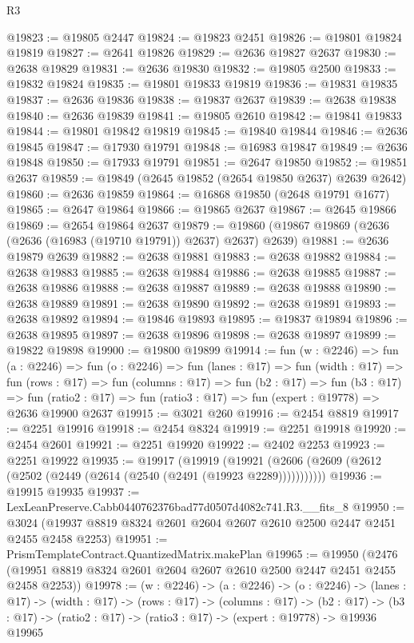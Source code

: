 \begin{lexlean}{R3}
\begin{coremodule}
@19823 := @19805 @2447
@19824 := @19823 @2451
@19826 := @19801 @19824 @19819
@19827 := @2641 @19826
@19829 := @2636 @19827 @2637
@19830 := @2638 @19829
@19831 := @2636 @19830
@19832 := @19805 @2500
@19833 := @19832 @19824
@19835 := @19801 @19833 @19819
@19836 := @19831 @19835
@19837 := @2636 @19836
@19838 := @19837 @2637
@19839 := @2638 @19838
@19840 := @2636 @19839
@19841 := @19805 @2610
@19842 := @19841 @19833
@19844 := @19801 @19842 @19819
@19845 := @19840 @19844
@19846 := @2636 @19845
@19847 := @17930 @19791
@19848 := @16983 @19847
@19849 := @2636 @19848
@19850 := @17933 @19791
@19851 := @2647 @19850
@19852 := @19851 @2637
@19859 := @19849 (@2645 @19852 (@2654 @19850 @2637) @2639 @2642)
@19860 := @2636 @19859
@19864 := @16868 @19850 (@2648 @19791 @1677)
@19865 := @2647 @19864
@19866 := @19865 @2637
@19867 := @2645 @19866
@19869 := @2654 @19864 @2637
@19879 := @19860 (@19867 @19869 (@2636 (@2636 (@16983 (@19710 @19791)) @2637) @2637) @2639)
@19881 := @2636 @19879 @2639
@19882 := @2638 @19881
@19883 := @2638 @19882
@19884 := @2638 @19883
@19885 := @2638 @19884
@19886 := @2638 @19885
@19887 := @2638 @19886
@19888 := @2638 @19887
@19889 := @2638 @19888
@19890 := @2638 @19889
@19891 := @2638 @19890
@19892 := @2638 @19891
@19893 := @2638 @19892
@19894 := @19846 @19893
@19895 := @19837 @19894
@19896 := @2638 @19895
@19897 := @2638 @19896
@19898 := @2638 @19897
@19899 := @19822 @19898
@19900 := @19800 @19899
@19914 := fun (w : @2246) =>
  fun (a : @2246) =>
  fun (o : @2246) =>
  fun (lanes : @17) =>
  fun (width : @17) =>
  fun (rows : @17) =>
  fun (columns : @17) =>
  fun (b2 : @17) =>
  fun (b3 : @17) =>
  fun (ratio2 : @17) => fun (ratio3 : @17) => fun (expert : @19778) => @2636 @19900 @2637
@19915 := @3021 @260
@19916 := @2454 @8819
@19917 := @2251 @19916
@19918 := @2454 @8324
@19919 := @2251 @19918
@19920 := @2454 @2601
@19921 := @2251 @19920
@19922 := @2402 @2253
@19923 := @2251 @19922
@19935 := @19917
    (@19919 (@19921 (@2606 (@2609 (@2612 (@2502 (@2449 (@2614 (@2540 (@2491 (@19923 @2289)))))))))))
@19936 := @19915 @19935
@19937 := LexLeanPreserve.Cabb0440762376bad77d0507d4082c741.R3.__fits_8
@19950 := @3024 (@19937 @8819 @8324 @2601 @2604 @2607 @2610 @2500 @2447 @2451 @2455 @2458 @2253)
@19951 := PrismTemplateContract.QuantizedMatrix.makePlan
@19965 := @19950
    (@2476 (@19951 @8819 @8324 @2601 @2604 @2607 @2610 @2500 @2447 @2451 @2455 @2458 @2253))
@19978 := (w : @2246) ->
  (a : @2246) ->
  (o : @2246) ->
  (lanes : @17) ->
  (width : @17) ->
  (rows : @17) ->
  (columns : @17) ->
  (b2 : @17) -> (b3 : @17) -> (ratio2 : @17) -> (ratio3 : @17) -> (expert : @19778) -> @19936 @19965

\end{coremodule}
\end{lexlean}
